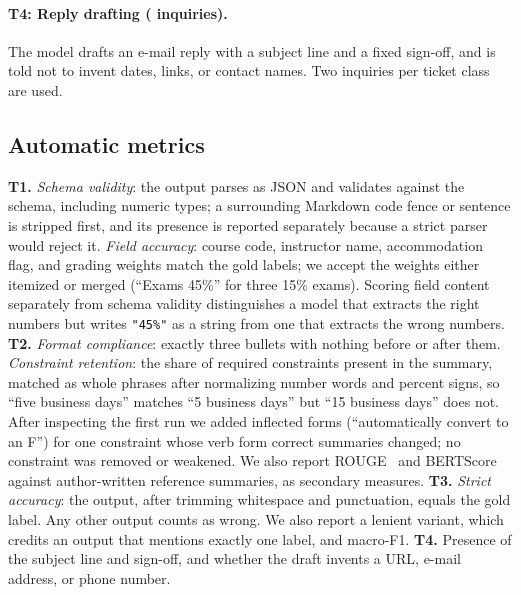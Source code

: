 \documentclass[sigconf,nonacm]{acmart}
\begin{document}
\paragraph{T4: Reply drafting (\NDrafting{} inquiries).}
The model drafts an e-mail reply with a subject line and a fixed sign-off, and is told not to invent dates, links, or contact names.
Two inquiries per ticket class are used.

\subsection{Automatic metrics}
\textbf{T1.} \emph{Schema validity}: the output parses as JSON and validates against the schema, including numeric types; a surrounding Markdown code fence or sentence is stripped first, and its presence is reported separately because a strict parser would reject it.
\emph{Field accuracy}: course code, instructor name, accommodation flag, and grading weights match the gold labels; we accept the weights either itemized or merged (``Exams 45\%'' for three 15\% exams).
Scoring field content separately from schema validity distinguishes a model that extracts the right numbers but writes \texttt{"45\%"} as a string from one that extracts the wrong numbers.
\textbf{T2.} \emph{Format compliance}: exactly three bullets with nothing before or after them.
\emph{Constraint retention}: the share of required constraints present in the summary, matched as whole phrases after normalizing number words and percent signs, so ``five business days'' matches ``5 business days'' but ``15 business days'' does not.
After inspecting the first run we added inflected forms (``automatically convert to an F'') for one constraint whose verb form correct summaries changed; no constraint was removed or weakened.
We also report ROUGE~\cite{lin2004rouge} and BERTScore~\cite{zhang2020bertscore} against author-written reference summaries, as secondary measures.
\textbf{T3.} \emph{Strict accuracy}: the output, after trimming whitespace and punctuation, equals the gold label.
Any other output counts as wrong.
We also report a lenient variant, which credits an output that mentions exactly one label, and macro-F1.
\textbf{T4.} Presence of the subject line and sign-off, and whether the draft invents a URL, e-mail address, or phone number.
\end{document}
